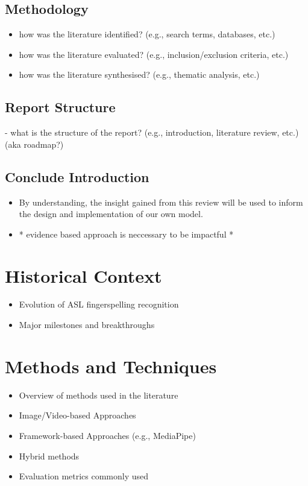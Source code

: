 \subsection{Methodology}
\begin{itemize}
    \item how was the literature identified? (e.g., search terms, databases, etc.)
    \item how was the literature evaluated? (e.g., inclusion/exclusion criteria, etc.)
    \item how was the literature synthesised? (e.g., thematic analysis, etc.)
\end{itemize}

\subsection{Report Structure}
- what is the structure of the report? (e.g., introduction, literature review, etc.) (aka roadmap?)

\subsection{Conclude Introduction}

\begin{itemize}
    \item By understanding, the insight gained from this review will be used to inform the design and implementation of our own model.
    \item * evidence based approach is neccessary to be impactful *

\end{itemize}
\section{Historical Context}
\begin{itemize}
    \item Evolution of ASL fingerspelling recognition
    \item Major milestones and breakthroughs
\end{itemize}

\section{Methods and Techniques}
\begin{itemize}
    \item Overview of methods used in the literature
    \item Image/Video-based Approaches
    \item Framework-based Approaches (e.g., MediaPipe)
    \item Hybrid methods
    \item Evaluation metrics commonly used
\end{itemize}

